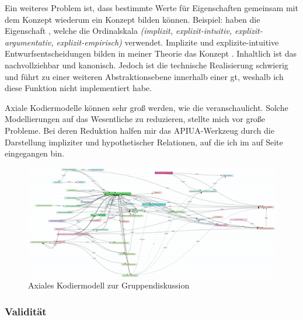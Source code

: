 Ein weiteres Problem ist, dass bestimmte Werte für Eigenschaften gemeinsam mit dem Konzept wiederum ein Konzept bilden können. Beispiel:  haben die Eigenschaft , welche die Ordinalskala \textit{(implizit, explizit-intuitiv, explizit-argumentativ, explizit-empirisch)} verwendet. Implizite und explizite-intuitive Entwurfsentscheidungen bilden in meiner Theorie das Konzept . Inhaltlich ist das nachvollziehbar und kanonisch. Jedoch ist die technische Realisierung schwierig und führt zu einer weiteren Abstraktionsebene innerhalb einer \acrfull{gt}, weshalb ich diese Funktion nicht implementiert habe.

\label{sec:Datenanalyse-STL-Inkonsistenzen-vereinfachen}
Axiale Kodiermodelle können sehr groß werden, wie die  veranschaulicht. Solche Modellierungen auf das Wesentliche zu reduzieren, stellte mich vor große Probleme. Bei deren Reduktion halfen mir das APIUA-Werkzeug durch die Darstellung impliziter und hypothetischer Relationen, auf die ich im  auf Seite \pageref{sec:Erkenntnisperspektive} eingegangen bin.

\begin{figure}
\begin{minipage}{\textwidth}
  \centering
    \includegraphics[width=1.0\linewidth]{Figures/research/gc-acm.png}
  \caption[Axiales Kodiermodell zur Gruppendiskussion]{Axiales Kodiermodell zur Gruppendiskussion}
  \label{fig:research-gc-acm}
\end{minipage}
\end{figure}




\subsubsection{Validität}
\label{sec:probleme-validierung}

